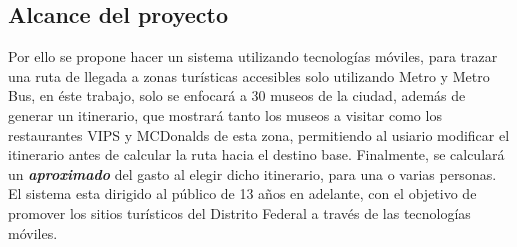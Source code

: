 \subsection{Alcance del proyecto}
Por ello se propone hacer un sistema utilizando tecnolog\'ias m\'oviles, para trazar una ruta de llegada a zonas tur\'isticas accesibles solo utilizando 
Metro y Metro Bus, en \'este trabajo, solo se enfocar\'a a 30 museos de la ciudad, adem\'as de generar un itinerario, que mostrar\'a tanto los museos a visitar
como los restaurantes VIPS y MCDonalds de esta zona, permitiendo al usiario modificar el itinerario antes de calcular la ruta hacia el destino base. Finalmente, se calcular\'a un
\textit{\textbf{aproximado}} del gasto al elegir dicho itinerario, para una o varias personas.
El sistema esta dirigido al p\'ublico de 13 a\~nos en adelante, con el objetivo de promover los sitios tur\'isticos del Distrito Federal
a trav\'es de las tecnolog\'ias m\'oviles.


